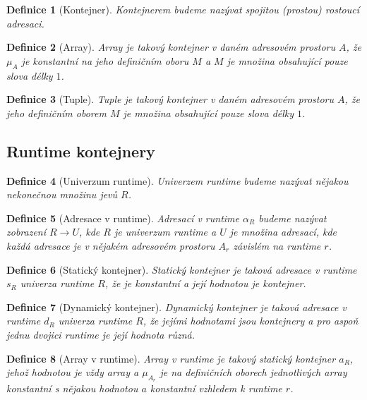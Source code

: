 \documentclass[a4paper,12pt]{article}
\newtheorem{definition}{Definice}[section]
\begin{document}
\begin{definition}[Kontejner]
    Kontejnerem budeme nazývat spojitou (prostou) rostoucí adresaci.
\end{definition}

\begin{definition}[Array]
    Array je takový kontejner v daném adresovém prostoru $A$, že $\mu_A$ je konstantní na jeho definičním oboru $M$ a $M$ je množina obsahující pouze slova délky $1$.
\end{definition}

\begin{definition}[Tuple]
    Tuple je takový kontejner v daném adresovém prostoru $A$, že jeho definičním oborem $M$ je množina obsahující pouze slova délky $1$.
\end{definition}

\subsection{Runtime kontejnery}

\begin{definition}[Univerzum runtime]
    Univerzem runtime budeme nazývat nějakou nekonečnou množinu jevů $R$.
\end{definition}

\begin{definition}[Adresace v runtime]
    Adresací v runtime $\alpha_R$ budeme nazývat zobrazení $R \to U$, kde $R$ je univerzum runtime a $U$ je množina adresací, kde každá adresace je v nějakém adresovém prostoru $A_r$ závislém na runtime $r$.
\end{definition}

\begin{definition}[Statický kontejner]
    Statický kontejner je taková adresace v runtime $s_R$ univerza runtime $R$, že je konstantní a její hodnotou je kontejner.
\end{definition}

\begin{definition}[Dynamický kontejner]
    Dynamický kontejner je taková adresace v runtime $d_R$ univerza runtime $R$, že jejími hodnotami jsou kontejnery a pro aspoň jednu dvojici runtime je její hodnota různá.
\end{definition}

\begin{definition}[Array v runtime]
    Array v runtime je takový statický kontejner $a_R$, jehož hodnotou je vždy array a $\mu_{A_r}$ je na definičních oborech jednotlivých array konstantní s nějakou hodnotou $a$ konstantní vzhledem k runtime $r$.
\end{definition}
\end{document}
